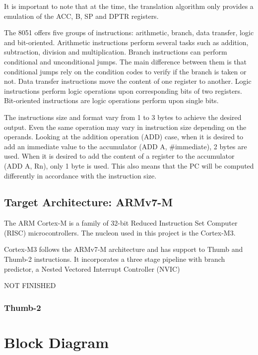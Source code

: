 \documentclass{report}
\begin{document}
		\par It is important to note that at the time, the translation algorithm only provides a emulation of the ACC, B, SP and DPTR registers.
		\par The 8051 offers five groups of instructions: arithmetic, branch, data transfer, logic and bit-oriented. Arithmetic instructions perform several tasks such as addition, subtraction, division and multiplication. Branch instructions can perform conditional and unconditional jumps. The main difference between them is that conditional jumps rely on the condition codes to verify if the branch is taken or not. Data transfer instructions move the content of one register to another. Logic instructions perform logic operations upon corresponding bits of two registers. Bit-oriented instructions are logic operations perform upon single bits\cite{mikroelektronika}.
		\par The instructions size and format vary from 1 to 3 bytes to achieve the desired output. Even the same operation may vary in instruction size depending on the operands. Looking at the addition operation (ADD) case, when it is desired to add an immediate value to the accumulator (ADD A, \#immediate), 2 bytes are used. When it is desired to add the content of a register to the accumulator (ADD A, Rn), only 1 byte is used. This also means that the PC will be computed differently in accordance with the instruction size.
		
		\subsection{Target Architecture: ARMv7-M}
		
		\par The ARM Cortex-M is a family of 32-bit Reduced Instruction Set Computer (RISC) microcontrollers. The nucleon used in this project is the Cortex-M3.
		\par Cortex-M3 follows the ARMv7-M architecture and has support to Thumb and Thumb-2 instructions. It incorporates a three stage pipeline with branch predictor, a Nested Vectored Interrupt Controller (NVIC) 
		
		\par NOT FINISHED
		
			\subsubsection{Thumb-2}
			
	\section{Block Diagram}
	
\end{document}
